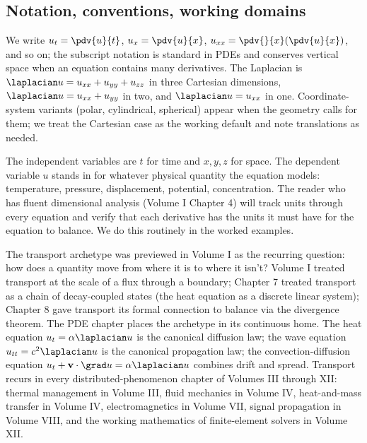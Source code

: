 \subsection{Notation, conventions, working domains}

We write $u_{t} = \pdv{u}{t}$, $u_{x} = \pdv{u}{x}$, $u_{xx} =
\pdv{}{x}\!\left(\pdv{u}{x}\right)$, and so on; the subscript
notation is standard in PDEs and conserves vertical space when an
equation contains many derivatives. The Laplacian is
$\laplacian u = u_{xx} + u_{yy} + u_{zz}$ in three Cartesian
dimensions, $\laplacian u = u_{xx} + u_{yy}$ in two, and
$\laplacian u = u_{xx}$ in one. Coordinate-system variants
(polar, cylindrical, spherical) appear when the geometry calls
for them; we treat the Cartesian case as the working default and
note translations as needed.

The independent variables are $t$ for time and $x, y, z$ for
space. The dependent variable $u$ stands in for whatever physical
quantity the equation models: temperature, pressure, displacement,
potential, concentration. The reader who has fluent dimensional
analysis (Volume I Chapter 4) will track units through every
equation and verify that each derivative has the units it must
have for the equation to balance. We do this routinely in the
worked examples.

\begin{archetype}
The transport archetype was previewed in Volume I as the recurring
question: how does a quantity move from where it is to where it
isn't? Volume I treated transport at the scale of a flux through a
boundary; Chapter 7 treated transport as a chain of decay-coupled
states (the heat equation as a discrete linear system); Chapter 8
gave transport its formal connection to balance via the divergence
theorem. The PDE chapter places the archetype in its continuous
home. The heat equation $u_{t} = \alpha \laplacian u$ is the
canonical diffusion law; the wave equation $u_{tt} = c^{2}
\laplacian u$ is the canonical propagation law; the
convection-diffusion equation $u_{t} + \mathbf{v}\cdot \grad u =
\alpha \laplacian u$ combines drift and spread. Transport
recurs in every distributed-phenomenon chapter of Volumes III
through XII: thermal management in Volume III, fluid mechanics in
Volume IV, heat-and-mass transfer in Volume IV, electromagnetics in
Volume VII, signal propagation in Volume VIII, and the working
mathematics of finite-element solvers in Volume XII.
\end{archetype}

